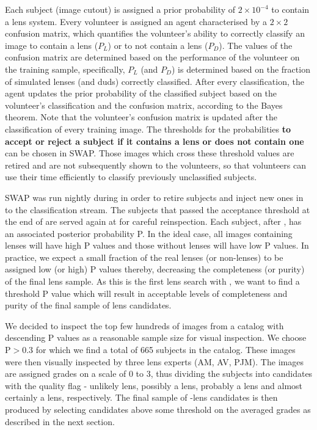 \documentclass[useAMS,usenatbib,a4paper]{mn2e}
\begin{document}
Each subject (image cutout) is assigned a prior probability of
$2\times10^{-4}$ to contain a lens system. Every volunteer
is assigned an agent characterised by a $2\times2$ confusion matrix,
which quantifies the volunteer's ability to correctly classify an image
to contain a lens ($P_L$) or to not contain a lens ($P_D$). The values of
the confusion matrix are determined based on the performance of the
volunteer on the training sample, specifically, $P_L$ (and $P_D$) is
determined based on the fraction of simulated lenses (and duds)
correctly classified. After every classification, the agent updates the
prior probability of the classified subject based on the volunteer's classification
and the confusion matrix, according to the Bayes theorem.
Note that the volunteer's confusion matrix is updated after the
classification of every training image. The thresholds for the
probabilities {\bf to accept or reject a subject if it contains a lens or does
not contain one} can be chosen in SWAP. Those images which cross
these threshold values are retired and are not subsequently shown to the
volunteers, so that volunteers can use their time efficiently to
classify previously unclassified subjects.

SWAP was run nightly during \StageOne in order to retire subjects and inject new
ones in to the classification stream. The subjects that passed the acceptance
threshold at the end of \StageOne are served again at \StageTwo for careful
reinspection. Each subject, after \StageTwo, has an associated posterior
probability P. In the ideal case, all images containing lenses will have high P
values and those without lenses will have low P values. In practice, we expect a
small fraction of the real lenses (or non-lenses) to be assigned low (or high) P
values thereby, decreasing the completeness (or purity) of the final lens
sample. As this is the first lens search with \sw, we want to find a
threshold P value which will result in acceptable levels of completeness and
purity of the final sample of lens candidates.

We decided to inspect the top few hundreds of images from a catalog with
descending P values as a reasonable sample size for visual inspection.
We choose P$>0.3$ for which we find a total of 665 subjects in the
catalog. These images were then visually inspected by three lens experts
(AM, AV, PJM).  The images are assigned grades on a scale of 0 to 3,
thus dividing the subjects into candidates with the quality flag -
unlikely lens, possibly a lens, probably a lens and almost certainly a
lens, respectively. The final sample of \sw-\cfhtls lens candidates is
then produced by selecting candidates above some threshold on the
averaged grades as described in the next section.
\end{document}

